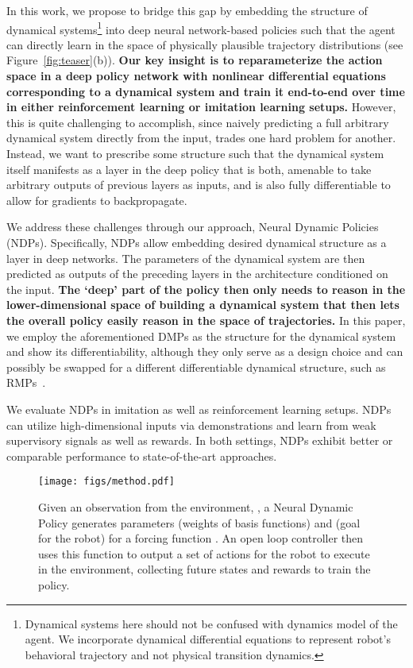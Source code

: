 \documentclass{article}
\newcommand{\ours}{NDPs\xspace}
\begin{document}
In this work, we propose to bridge this gap by embedding the structure of dynamical systems\footnote{Dynamical systems here should not be confused with dynamics model of the agent. We incorporate dynamical differential equations to represent robot's behavioral trajectory and not physical transition dynamics.} into deep neural network-based policies such that the agent can directly learn in the space of physically plausible trajectory distributions (see Figure~\ref{fig:teaser}(b)). \textbf{Our key insight is to reparameterize the action space in a deep policy network with nonlinear differential equations corresponding to a dynamical system and train it end-to-end over time in either reinforcement learning or imitation learning setups.}
However, this is quite challenging to accomplish, since naively predicting a full arbitrary dynamical system directly from the input, trades one hard problem for another. Instead, we want to prescribe some structure such that the dynamical system itself manifests as a layer in the deep policy that is both, amenable to take arbitrary outputs of previous layers as inputs, and is also fully differentiable to allow for gradients to backpropagate.

We address these challenges through our approach, Neural Dynamic Policies (\ours). Specifically, \ours allow embedding desired dynamical structure as a layer in deep networks. The parameters of the dynamical system are then predicted as outputs of the preceding layers in the architecture conditioned on the input. \textbf{The `deep' part of the policy then only needs to reason in the lower-dimensional space of building a dynamical system that then lets the overall policy easily reason in the space of trajectories.} In this paper, we employ the aforementioned DMPs as the structure for the dynamical system and show its differentiability, although they only serve as a design choice and can possibly be swapped for a different differentiable dynamical structure, such as RMPs~\cite{ratliff2018riemannian}.

We evaluate \ours in imitation as well as reinforcement learning setups. \ours can utilize high-dimensional inputs via demonstrations and learn from weak supervisory signals as well as rewards. In both settings, \ours exhibit better or comparable performance to state-of-the-art approaches.

\begin{figure}[t]
  \centering
  \texttt{[image: figs/method.pdf]}
  \caption{\small Given an observation from the environment, , a Neural Dynamic Policy generates parameters  (weights of basis functions) and  (goal for the robot) for a forcing function . An open loop controller then uses this function to output a set of actions for the robot to execute in the environment, collecting future states and rewards to train the policy.}
  \vspace{-0.2in}
  \label{fig:method}
\end{figure}
\end{document}
